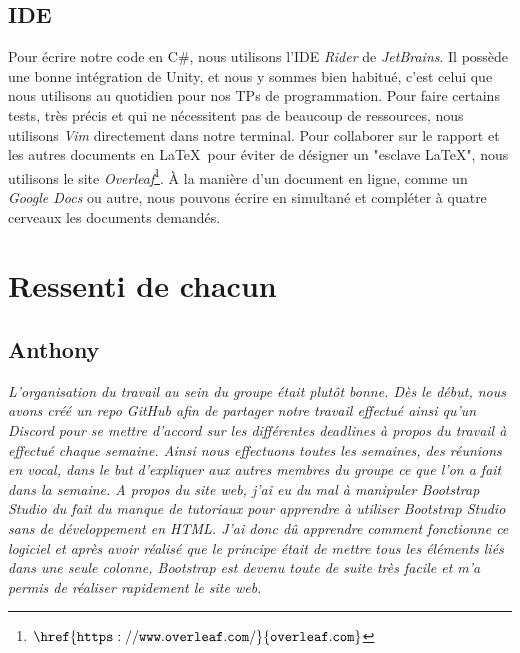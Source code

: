 \documentclass[12pt,a4paper]{article}
\begin{document}
    \subsection{IDE}
        Pour écrire notre code en C\#, nous utilisons l'IDE \textsl{Rider} de 
        \textsl{JetBrains}. Il possède une bonne intégration de Unity, et nous
        y sommes bien habitué, c'est celui que nous utilisons au quotidien pour
        nos TPs de programmation. Pour faire certains tests, très précis et qui
        ne nécessitent pas de beaucoup de ressources, nous utilisons \textsl{Vim}
        directement dans notre terminal.
        Pour collaborer sur le rapport et les autres documents en \LaTeX\, 
        pour éviter de désigner un "esclave \LaTeX", nous utilisons le site 
        \textsl{Overleaf}\footnote{\(\mathtt{\href{https://www.overleaf.com/}
        {overleaf.com}}\)}. À la manière d'un document en ligne, comme 
        un \textsl{Google Docs} ou autre, nous pouvons écrire en
        simultané et compléter à quatre cerveaux les documents demandés.

\clearpage

\section{Ressenti de chacun}
    \subsection{Anthony}
        \textit{L’organisation du travail au sein du groupe était plutôt bonne.
        Dès le début, nous avons créé un repo \textsl{GitHub} afin de partager notre travail 
        effectué ainsi qu’un \textsl{Discord} pour se mettre d’accord sur les différentes 
        deadlines à propos du travail à effectué chaque semaine. Ainsi nous 
        effectuons toutes les semaines, des réunions en vocal, dans le but 
        d’expliquer aux autres membres du groupe ce que l’on a fait dans la 
        semaine. A propos du site web, j’ai eu du mal à manipuler \textsl{Bootstrap Studio} 
        du fait du manque de tutoriaux pour apprendre à utiliser \textsl{Bootstrap Studio}
        sans de développement en HTML. J’ai donc dû apprendre comment fonctionne 
        ce logiciel et après avoir réalisé que le principe était de mettre tous 
        les éléments liés dans une seule colonne, \textsl{Bootstrap} est devenu toute de 
        suite très facile et m’a permis de réaliser rapidement le site web.}
  
\end{document}
